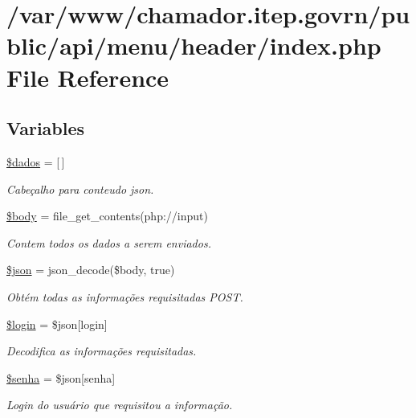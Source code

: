 \hypertarget{menu_2header_2index_8php}{}\section{/var/www/chamador.itep.\+govrn/public/api/menu/header/index.php File Reference}
\label{menu_2header_2index_8php}
\subsection*{Variables}
\begin{DoxyCompactItemize}
\item 
\hyperlink{menu_2header_2index_8php_a252370d95039a38fa11afab784725d58}{\$dados} = \mbox{[}$\,$\mbox{]}
\begin{DoxyCompactList}\small\item\em Cabeçalho para conteudo json. \end{DoxyCompactList}\item 
\hyperlink{menu_2header_2index_8php_a26b9f9373f7bb79dfcf8a86dff086b45}{\$body} = file\+\_\+get\+\_\+contents(\textquotesingle{}php\+://input\textquotesingle{})
\begin{DoxyCompactList}\small\item\em Contem todos os dados a serem enviados. \end{DoxyCompactList}\item 
\hyperlink{menu_2header_2index_8php_acedd13b51401130848ce18f4d5c52605}{\$json} = json\+\_\+decode(\$body, true)
\begin{DoxyCompactList}\small\item\em Obtém todas as informações requisitadas P\+O\+ST. \end{DoxyCompactList}\item 
\hyperlink{menu_2header_2index_8php_afc31993e855f9631572adfedcfe6f34b}{\$login} = \$json\mbox{[}\textquotesingle{}login\textquotesingle{}\mbox{]}
\begin{DoxyCompactList}\small\item\em Decodifica as informações requisitadas. \end{DoxyCompactList}\item 
\hyperlink{menu_2header_2index_8php_a3678c8769c9698fd30581c1016c5f475}{\$senha} = \$json\mbox{[}\textquotesingle{}senha\textquotesingle{}\mbox{]}
\begin{DoxyCompactList}\small\item\em Login do usuário que requisitou a informação. \end{DoxyCompactList}\item 

\end{DoxyCompactItemize}
